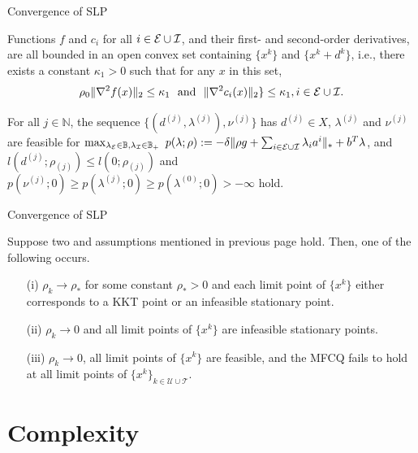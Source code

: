 \documentclass[8pt]{beamer}
\begin{document}
	\begin{frame}{Convergence of SLP}
		\begin{assumption}\label{ass.algorithm}
			Functions $f$ and $c_i$ for all $i \in {\cal E}\cup{\cal I}$, and their first- and second-order  derivatives, are all  bounded in an open convex set containing $\{x^k\}$ and $\{x^k+d^k\}$, i.e., there exists a constant  $\kappa_1>0$  such that  for any $x$ in this set, 
			\[  \rho_0\|\nabla^2f(x)\|_2 \le \kappa_1\ \text{  and  }\  \|\nabla^2c_i(x)\|_2 \} \le \kappa_1, i\in{\cal E}\cup{\cal I}.\] 
		\end{assumption}
		\vfill
		\begin{assumption}
			For all $j \in \mathbb{N}$, the sequence $\{(d^{(j)},\lambda^{(j)}), \nu^{(j)}\}$ has $d^{(j)} \in X$, $\lambda^{(j)}$ and $\nu^{(j)}$ are feasible for $\max_{\lambda_{{\cal E}} \in \mathbb{B}, \lambda_{{\cal I}}\in\mathbb{B}_+}\ p(\lambda; \rho):= -  \delta\|\rho g+\sum_{i\in{\cal E}\cup{\cal I}}\lambda_i a^i \|_* + b^T \lambda$,  and  $l(d^{(j)}; \rho_{(j)}) \leq l(0; \rho_{(j)}) $ and $p(\nu^{(j)}; 0) \geq p(\lambda^{(j)}; 0) \geq p(\lambda^{(0)}; 0) > - \infty$ hold.
		\end{assumption}
		\vfill
	\end{frame}

	\begin{frame}{Convergence of SLP}
		\vfill
		\begin{theorem}  Suppose two and assumptions mentioned in previous page hold. Then, one of the following occurs.
		\begin{enumerate}
			\item[(i)]  $\rho_k \to \rho_*$ for some constant $\rho_*>0$ and each limit point of $\{x^k\}$ either corresponds to a KKT point or an infeasible stationary point.
			\item[(ii)] $\rho_k \to 0$ and all limit points of $\{x^k\}$ are infeasible stationary points.
			\item[(iii)]  $\rho_k \to 0$, all limit points of $\{x^k\}$ are feasible, and the MFCQ fails to hold at all limit points of $\{x^k\}_{k\in\mathcal{U} \cup\mathcal{T}}$.			
		\end{enumerate}\end{theorem}
	\end{frame}


\section{Complexity}
\end{document}
